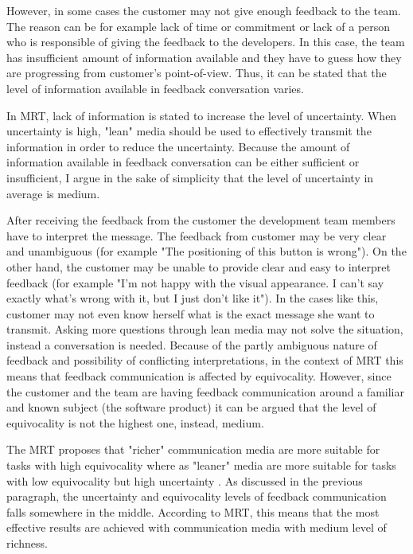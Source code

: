 \documentclass[english,12pt,a4paper,pdftex]{article}
\begin{document}
However, in some cases the customer may not give enough feedback to the team. The reason can be for example lack of time or commitment or lack of a person who is responsible of giving the feedback to the developers. In this case, the team has insufficient amount of information available and they have to guess how they are progressing from customer's point-of-view. Thus, it can be stated that the level of information available in feedback conversation varies. 

In \ac{MRT}, lack of information is stated to increase the level of uncertainty. When uncertainty is high, "lean" media should be used to effectively transmit the information in order to reduce the uncertainty. Because the amount of information available in feedback conversation can be either sufficient or insufficient, I argue in the sake of simplicity that the level of uncertainty in average is medium.

After receiving the feedback from the customer the development team members have to interpret the message. The feedback from customer may be very clear and unambiguous (for example "The positioning of this button is wrong"). On the other hand, the customer may be unable to provide clear and easy to interpret feedback (for example "I'm not happy with the visual appearance. I can't say exactly what's wrong with it, but I just don't like it"). In the cases like this, customer may not even know herself what is the exact message she want to transmit. Asking more questions through lean media may not solve the situation, instead a conversation is needed. Because of the partly ambiguous nature of feedback and possibility of conflicting interpretations, in the context of \ac{MRT} this means that feedback communication is affected by equivocality. However, since the customer and the team are having feedback communication around a familiar and known subject (the software product) it can be argued that the level of equivocality is not the highest one, instead, medium.

The \ac{MRT} proposes that "richer" communication media are more suitable for tasks with high equivocality where as "leaner" media are more suitable for tasks with low equivocality but high uncertainty \citep{daft1986}. As discussed in the previous paragraph, the uncertainty and equivocality levels of feedback communication falls somewhere in the middle. According to \ac{MRT}, this means that the most effective results are achieved with communication media with medium level of richness.
\end{document}
